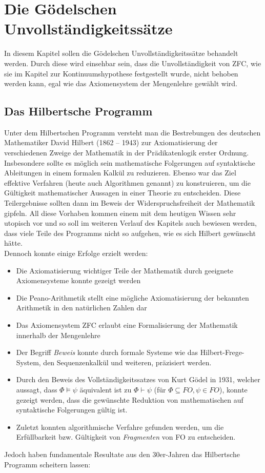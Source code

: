 \clearpage

\section{Die Gödelschen Unvollständigkeitssätze}

In diesem Kapitel sollen die Gödelschen Unvollständigkeitssätze behandelt werden. 
Durch diese wird einsehbar sein, dass die Unvollständigkeit von ZFC, wie sie im Kapitel zur Kontinuumshypothese festgestellt wurde, nicht behoben werden kann, egal wie das Axiomensystem der Mengenlehre gewählt wird.

\subsection{Das Hilbertsche Programm}

Unter dem Hilbertschen Programm versteht man die Bestrebungen des deutschen Mathematiker David Hilbert (1862 – 1943) zur Axiomatisierung der verschiedenen Zweige der Mathematik in der Prädikatenlogik erster Ordnung.
Insbesondere sollte es möglich sein mathematische Folgerungen auf syntaktische Ableitungen in einem formalen Kalkül zu reduzieren. Ebenso war das Ziel effektive Verfahren (heute auch Algorithmen genannt) zu konstruieren, um die Gültigkeit mathematischer Aussagen in einer Theorie zu entscheiden.
Diese Teilergebnisse sollten dann im Beweis der Widerspruchsfreiheit der Mathematik gipfeln. All diese Vorhaben kommen einem mit dem heutigen Wissen sehr utopisch vor und so soll im weiteren Verlauf des Kapitels auch bewiesen werden, dass viele Teile des Programms nicht so aufgehen, wie es sich Hilbert gewünscht hätte.\\
Dennoch konnte einige Erfolge erzielt werden:
\begin{itemize}
	\item Die Axiomatisierung wichtiger Teile der Mathematik durch geeignete Axiomensysteme konnte gezeigt werden
	\item Die Peano-Arithmetik stellt eine mögliche Axiomatisierung der bekannten Arithmetik in den natürlichen Zahlen dar
	\item Das Axiomensystem ZFC erlaubt eine Formalisierung der Mathematik innerhalb der Mengenlehre
	\item Der Begriff \textit{Beweis} konnte durch formale Systeme wie das Hilbert-Frege-System, den Sequenzenkalkül und weiteren, präzisiert werden.
	\item Durch den Beweis des Vollständigkeitssatzes von Kurt Gödel in 1931, welcher aussagt, dass $\Phi \models \psi$ äquivalent ist zu $\Phi \vdash \psi$ (für $\Phi\subseteq FO, \psi\in FO$), konnte gezeigt werden, dass die gewünschte Reduktion von mathematischen auf syntaktische Folgerungen gültig ist.
	\item Zuletzt konnten algorithmische Verfahre gefunden werden, um die Erfüllbarkeit bzw. Gültigkeit von \textit{Fragmenten} von FO zu entscheiden.
\end{itemize}
Jedoch haben fundamentale Resultate aus den 30er-Jahren das Hilbertsche Programm scheitern lassen:

